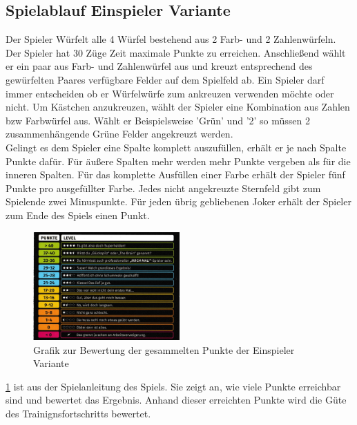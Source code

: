 \subsection{Spielablauf Einspieler Variante}
Der Spieler Würfelt alle 4 Würfel bestehend aus 2 Farb- und 2 Zahlenwürfeln.
Der Spieler hat 30 Züge Zeit maximale Punkte zu erreichen.
Anschließend wählt er ein paar aus Farb- und Zahlenwürfel aus und kreuzt entsprechend des gewürfelten Paares verfügbare Felder auf dem Spielfeld ab.
Ein Spieler darf immer entscheiden ob er Würfelwürfe zum ankreuzen verwenden möchte oder nicht.
Um Kästchen anzukreuzen, wählt der Spieler eine Kombination aus Zahlen bzw Farbwürfel aus. Wählt er Beispielsweise 'Grün' und '2' so müssen 2 zusammenhängende Grüne Felder angekreuzt werden. \\
Gelingt es dem  Spieler eine Spalte komplett auszufüllen, erhält er je nach Spalte Punkte dafür. Für äußere Spalten mehr werden mehr Punkte vergeben als für die inneren Spalten.
Für das komplette Ausfüllen einer Farbe erhält der Spieler fünf Punkte pro ausgefüllter Farbe.
Jedes nicht angekreuzte Sternfeld gibt zum Spielende zwei Minuspunkte.
Für jeden übrig gebliebenen Joker erhält der Spieler zum Ende des Spiels einen Punkt.

\begin{figure}[!h]
	\centering
	\includegraphics[width=0.5\textwidth]{Bilder/Punkte.jpeg}
	\caption{Grafik zur Bewertung der gesammelten Punkte der Einspieler Variante}
	\label{fig:Punkteübersicht}
\end{figure}

\ref{fig:Punkteübersicht} ist aus der Spielanleitung des Spiels. Sie zeigt an, wie viele Punkte erreichbar sind und bewertet das Ergebnis. Anhand dieser erreichten Punkte wird die Güte des Trainignsfortschritts bewertet.
\newpage










